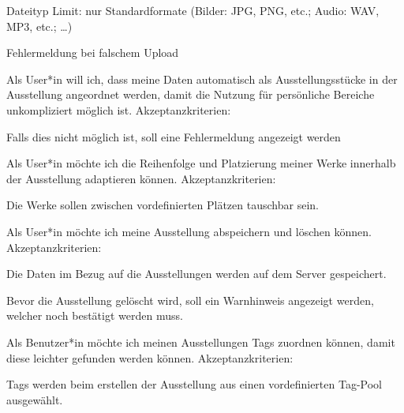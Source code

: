 \begin{compactenum}
\begin{compactitem}
        \item Dateityp Limit: nur Standardformate (Bilder: JPG, PNG, etc.;        Audio: WAV, MP3, etc.; …)
        \item Fehlermeldung bei falschem Upload
    \end{compactitem}
    \item  Als User*in will ich, dass meine Daten automatisch als Ausstellungsstücke in der Ausstellung angeordnet werden, damit die Nutzung für persönliche Bereiche unkompliziert möglich ist. Akzeptanzkriterien:
    \begin{compactitem}
        \item Falls dies nicht möglich ist, soll eine Fehlermeldung angezeigt werden
    \end{compactitem}
    \item Als User*in möchte ich die Reihenfolge und Platzierung meiner Werke innerhalb der Ausstellung adaptieren können. Akzeptanzkriterien:
    \begin{compactitem}
        \item Die Werke sollen zwischen vordefinierten Plätzen tauschbar sein.
    \end{compactitem}
    \item Als User*in möchte ich meine Ausstellung abspeichern und löschen können. Akzeptanzkriterien:
    \begin{compactitem}
        \item Die Daten im Bezug auf die Ausstellungen werden auf dem Server gespeichert.
        \item Bevor die Ausstellung gelöscht wird, soll ein Warnhinweis angezeigt werden, welcher noch bestätigt werden muss.
    \end{compactitem}
    \item Als Benutzer*in möchte ich meinen Ausstellungen Tags zuordnen können, damit diese leichter gefunden werden können. Akzeptanzkriterien:
    \begin{compactitem}
        \item Tags werden beim erstellen der Ausstellung aus einen vordefinierten Tag-Pool ausgewählt.
    \end{compactitem}
\end{compactenum}
 








